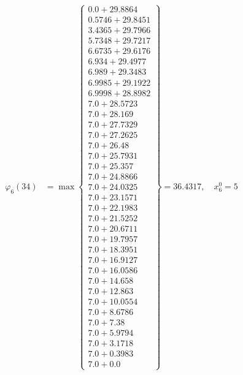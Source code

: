 \documentclass{article}
\begin{document}
\begin{align*}
  
\varphi_{6}(34) &= \max \left\{ \begin{array}{c}
0.0 + 29.8864 \\
 0.5746 + 29.8451 \\
 3.4365 + 29.7966 \\
 5.7348 + 29.7217 \\
 6.6735 + 29.6176 \\
 6.934 + 29.4977 \\
 6.989 + 29.3483 \\
 6.9985 + 29.1922 \\
 6.9998 + 28.8982 \\
 7.0 + 28.5723 \\
 7.0 + 28.169 \\
 7.0 + 27.7329 \\
 7.0 + 27.2625 \\
 7.0 + 26.48 \\
 7.0 + 25.7931 \\
 7.0 + 25.357 \\
 7.0 + 24.8866 \\
 7.0 + 24.0325 \\
 7.0 + 23.1571 \\
 7.0 + 22.1983 \\
 7.0 + 21.5252 \\
 7.0 + 20.6711 \\
 7.0 + 19.7957 \\
 7.0 + 18.3951 \\
 7.0 + 16.9127 \\
 7.0 + 16.0586 \\
 7.0 + 14.658 \\
 7.0 + 12.863 \\
 7.0 + 10.0554 \\
 7.0 + 8.6786 \\
 7.0 + 7.38 \\
 7.0 + 5.9794 \\
 7.0 + 3.1718 \\
 7.0 + 0.3983 \\
 7.0 + 0.0
\end{array} \right\}=36.4317,\quad x_{6}^0=5\\
  
  
  

\end{align*}
\end{document}
